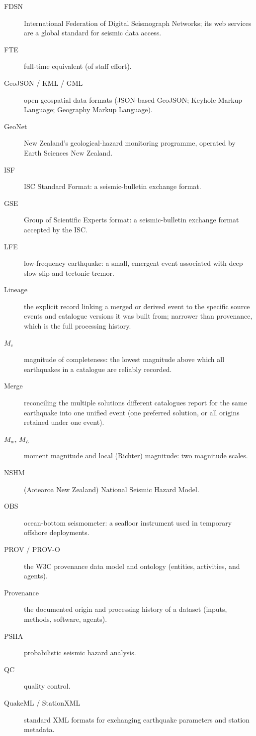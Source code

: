 \documentclass[11pt]{article}
\begin{document}
\begin{description}
\item[FDSN] International Federation of Digital Seismograph Networks; its web services are a global standard for seismic data access.
\item[FTE] full-time equivalent (of staff effort).
\item[GeoJSON / KML / GML] open geospatial data formats (JSON-based GeoJSON; Keyhole Markup Language; Geography Markup Language).
\item[GeoNet] New Zealand's geological-hazard monitoring programme, operated by Earth Sciences New Zealand.
\item[ISF] ISC Standard Format: a seismic-bulletin exchange format.
\item[GSE] Group of Scientific Experts format: a seismic-bulletin exchange format accepted by the ISC.
\item[LFE] low-frequency earthquake: a small, emergent event associated with deep slow slip and tectonic tremor.
\item[Lineage] the explicit record linking a merged or derived event to the specific source events and catalogue versions it was built from; narrower than provenance, which is the full processing history.
\item[$M_c$] magnitude of completeness: the lowest magnitude above which all earthquakes in a catalogue are reliably recorded.
\item[Merge] reconciling the multiple solutions different catalogues report for the same earthquake into one unified event (one preferred solution, or all origins retained under one event).
\item[$M_w$, $M_L$] moment magnitude and local (Richter) magnitude: two magnitude scales.
\item[NSHM] (Aotearoa New Zealand) National Seismic Hazard Model.
\item[OBS] ocean-bottom seismometer: a seafloor instrument used in temporary offshore deployments.
\item[PROV / PROV-O] the W3C provenance data model and ontology (entities, activities, and agents).
\item[Provenance] the documented origin and processing history of a dataset (inputs, methods, software, agents).
\item[PSHA] probabilistic seismic hazard analysis.
\item[QC] quality control.
\item[QuakeML / StationXML] standard XML formats for exchanging earthquake parameters and station metadata.

\end{description}
\end{document}
